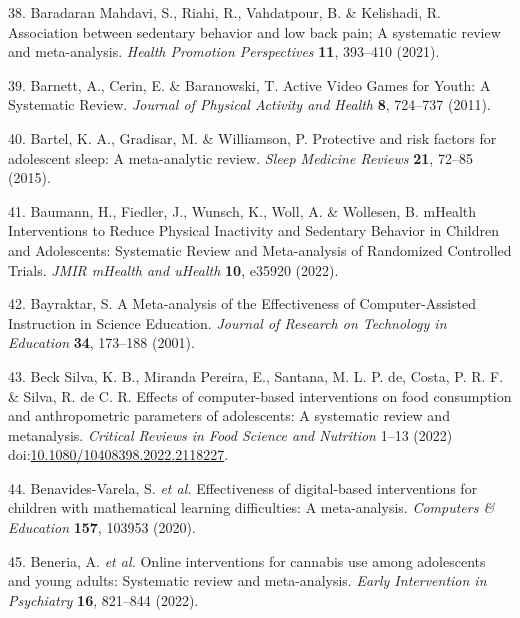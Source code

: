 \documentclass[
  english,
  man]{apa6}
\newenvironment{cslreferences}%
  {}%
  {\par}
\begin{document}
\begin{cslreferences}
\leavevmode\hypertarget{ref-baradaranmahdaviAssociationSedentaryBehavior2021}{}%
38. Baradaran Mahdavi, S., Riahi, R., Vahdatpour, B. \& Kelishadi, R. Association between sedentary behavior and low back pain; A systematic review and meta-analysis. \emph{Health Promotion Perspectives} \textbf{11}, 393--410 (2021).

\leavevmode\hypertarget{ref-barnettActiveVideoGames2011}{}%
39. Barnett, A., Cerin, E. \& Baranowski, T. Active Video Games for Youth: A Systematic Review. \emph{Journal of Physical Activity and Health} \textbf{8}, 724--737 (2011).

\leavevmode\hypertarget{ref-bartelProtectiveRiskFactors2015}{}%
40. Bartel, K. A., Gradisar, M. \& Williamson, P. Protective and risk factors for adolescent sleep: A meta-analytic review. \emph{Sleep Medicine Reviews} \textbf{21}, 72--85 (2015).

\leavevmode\hypertarget{ref-baumannMHealthInterventionsReduce2022}{}%
41. Baumann, H., Fiedler, J., Wunsch, K., Woll, A. \& Wollesen, B. mHealth Interventions to Reduce Physical Inactivity and Sedentary Behavior in Children and Adolescents: Systematic Review and Meta-analysis of Randomized Controlled Trials. \emph{JMIR mHealth and uHealth} \textbf{10}, e35920 (2022).

\leavevmode\hypertarget{ref-bayraktarMetaanalysisEffectivenessComputerassisted2001}{}%
42. Bayraktar, S. A Meta-analysis of the Effectiveness of Computer-Assisted Instruction in Science Education. \emph{Journal of Research on Technology in Education} \textbf{34}, 173--188 (2001).

\leavevmode\hypertarget{ref-becksilvaEffectsComputerbasedInterventions2022}{}%
43. Beck Silva, K. B., Miranda Pereira, E., Santana, M. L. P. de, Costa, P. R. F. \& Silva, R. de C. R. Effects of computer-based interventions on food consumption and anthropometric parameters of adolescents: A systematic review and metanalysis. \emph{Critical Reviews in Food Science and Nutrition} 1--13 (2022) doi:\href{https://doi.org/10.1080/10408398.2022.2118227}{10.1080/10408398.2022.2118227}.

\leavevmode\hypertarget{ref-benavides-varelaEffectivenessDigitalbasedInterventions2020}{}%
44. Benavides-Varela, S. \emph{et al.} Effectiveness of digital-based interventions for children with mathematical learning difficulties: A meta-analysis. \emph{Computers \& Education} \textbf{157}, 103953 (2020).

\leavevmode\hypertarget{ref-beneriaOnlineInterventionsCannabis2021}{}%
45. Beneria, A. \emph{et al.} Online interventions for cannabis use among adolescents and young adults: Systematic review and meta-analysis. \emph{Early Intervention in Psychiatry} \textbf{16}, 821--844 (2022).


\end{cslreferences}
\end{document}
